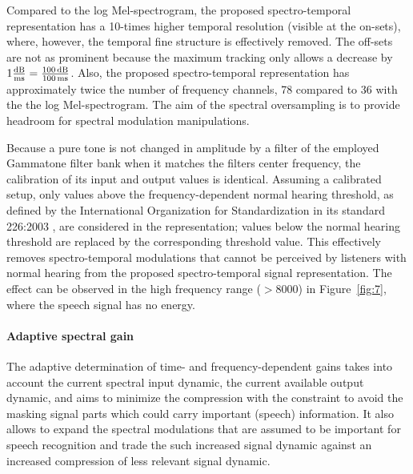 \documentclass[10pt,a4paper,twocolumn]{article}
\begin{document}
%
Compared to the log Mel-spectrogram, the proposed spectro-temporal representation has a 10-times higher temporal resolution (visible at the on-sets), where, however, the temporal fine structure is effectively removed.
%
The off-sets are not as prominent because the maximum tracking only allows a decrease by $1\frac{\text{dB}}{\text{ms}} = \frac{\text{100\,dB}}{\text{100\,ms}}$.
%
Also, the proposed spectro-temporal representation has approximately twice the number of frequency channels, 78 compared to 36 with the the log Mel-spectrogram.
%
The aim of the spectral oversampling is to provide headroom for spectral modulation manipulations.

Because a pure tone is not changed in amplitude by a filter of the employed Gammatone filter bank when it matches the filters center frequency, the calibration of its input and output values is identical.
%
Assuming a calibrated setup, only values above the frequency-dependent normal hearing threshold, as defined by the International Organization for Standardization in its standard 226:2003 \citep{iso2003}, are considered in the representation; values below the normal hearing threshold are replaced by the corresponding threshold value.
%
This effectively removes spectro-temporal modulations that cannot be perceived by listeners with normal hearing from the proposed spectro-temporal signal representation.
%
The effect can be observed in the high frequency range ($>8000$) in Figure~\ref{fig:7}, where the speech signal has no energy.

\paragraph{Adaptive spectral gain}
%
The adaptive determination of time- and frequency-dependent gains takes into account the current spectral input dynamic, the current available output dynamic, and aims to minimize the compression with the constraint to avoid the masking signal parts which could carry important (speech) information.
%
It also allows to expand the spectral modulations that are assumed to be important for speech recognition and trade the such increased signal dynamic against an increased compression of less relevant signal dynamic.
\end{document}
